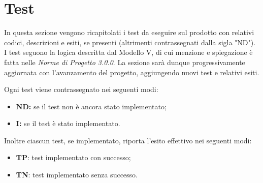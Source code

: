 \section{Test}
In questa sezione vengono ricapitolati i test da eseguire sul prodotto con relativi codici, descrizioni e esiti, se presenti (altrimenti contrassegnati dalla sigla "ND"). I test seguono la logica descritta dal Modello V, di cui menzione e spiegazione è fatta nelle \textit{Norme di Progetto 3.0.0\docs}. La sezione sarà dunque progressivamente aggiornata con l'avanzamento del progetto, aggiungendo nuovi test e relativi esiti.

Ogni test viene contrassegnato nei seguenti modi:
\begin{itemize}
	\item \textbf{ND:} se il test non è ancora stato implementato;
	\item \textbf{I:} se il test è stato implementato.
\end{itemize}
Inoltre ciascun test, se implementato, riporta l'esito effettivo nei seguenti modi:
\begin{itemize}
	\item \textbf{TP}: test implementato con successo;
	\item \textbf{TN}: test implementato senza successo.
\end{itemize}
